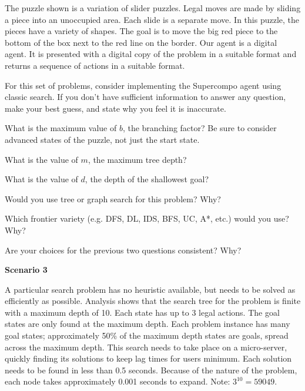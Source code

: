 \documentclass[11pt]{article}
\begin{document}
The puzzle shown is a variation of slider puzzles.  Legal moves are made
by sliding a piece into an unoccupied area.  Each slide is a separate
move.  In this puzzle, the pieces have a variety of shapes.  The goal
is to move the big red piece to the bottom of the box next to the
red line on the border.  Our agent is a digital agent.  It is presented with
a digital copy of the problem in a suitable format and returns a sequence
of actions in a suitable format.

For this set of problems, consider implementing the Supercompo agent using classic search.
If you don't have sufficient information to answer any question, make your
best guess, and state why you feel it is inaccurate.

\begin{problem}{2}
  What is the maximum value of $b$, the branching factor?  Be sure to consider
  advanced states of the puzzle, not just the start state.
  \vspace*{1in}
\end{problem}

\begin{problem}{2}
  What is the value of $m$, the maximum tree depth?
  \vspace*{1in}
\end{problem}

\begin{problem}{2}
  What is the value of $d$, the depth of the shallowest goal?
  \vspace*{1in}
\end{problem}

\begin{problem}{2}
  Would you use tree or graph search for this problem?  Why?
  \vspace*{1in}
\end{problem}

\begin{problem}{2}
  Which frontier variety (e.g. DFS, DL, IDS, BFS, UC, A*, etc.) would you use?  Why?
  \vspace*{1in}
\end{problem}

\begin{problem}{2}
  Are your choices for the previous two questions consistent? Why?
  \vspace*{1in}
\end{problem}


\newpage
\textbf{Scenario 3}

A particular search problem has no heuristic available, but needs to be solved as efficiently as possible.  Analysis shows that the search tree for the problem is finite with a maximum depth of 10.  Each state has up to 3 legal actions.  The goal states are only found at the maximum depth.  Each problem instance has many goal states;  approximately 50\% of the maximum depth states are goals, spread across the maximum depth.  This search needs to take place on a micro-server, quickly finding its solutions to keep lag times for users minimum.  Each solution needs to be found in less than 0.5 seconds.  Because of the nature of the problem, each node takes approximately 0.001 seconds to expand.  Note: $3^{10} = 59049$.
\end{document}
